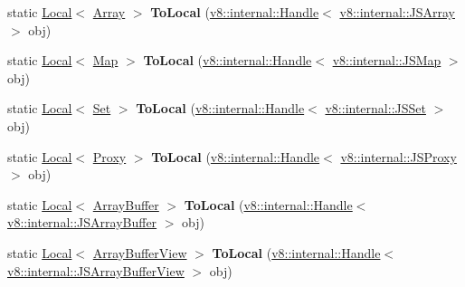\begin{DoxyCompactItemize}
\item 
static \hyperlink{classv8_1_1_local}{Local}$<$ \hyperlink{classv8_1_1_array}{Array} $>$ {\bfseries To\+Local} (\hyperlink{classv8_1_1internal_1_1_handle}{v8\+::internal\+::\+Handle}$<$ \hyperlink{classv8_1_1internal_1_1_j_s_array}{v8\+::internal\+::\+J\+S\+Array} $>$ obj)\hypertarget{classv8_1_1_utils_a574263d874f1c510592f745e3e26089b}{}\label{classv8_1_1_utils_a574263d874f1c510592f745e3e26089b}

\item 
static \hyperlink{classv8_1_1_local}{Local}$<$ \hyperlink{classv8_1_1_map}{Map} $>$ {\bfseries To\+Local} (\hyperlink{classv8_1_1internal_1_1_handle}{v8\+::internal\+::\+Handle}$<$ \hyperlink{classv8_1_1internal_1_1_j_s_map}{v8\+::internal\+::\+J\+S\+Map} $>$ obj)\hypertarget{classv8_1_1_utils_a5c596d6b1b5fec92ae8bcdec13edc4fc}{}\label{classv8_1_1_utils_a5c596d6b1b5fec92ae8bcdec13edc4fc}

\item 
static \hyperlink{classv8_1_1_local}{Local}$<$ \hyperlink{classv8_1_1_set}{Set} $>$ {\bfseries To\+Local} (\hyperlink{classv8_1_1internal_1_1_handle}{v8\+::internal\+::\+Handle}$<$ \hyperlink{classv8_1_1internal_1_1_j_s_set}{v8\+::internal\+::\+J\+S\+Set} $>$ obj)\hypertarget{classv8_1_1_utils_ac3774c0f66b1b6a3d8de716ef7aebe9e}{}\label{classv8_1_1_utils_ac3774c0f66b1b6a3d8de716ef7aebe9e}

\item 
static \hyperlink{classv8_1_1_local}{Local}$<$ \hyperlink{classv8_1_1_proxy}{Proxy} $>$ {\bfseries To\+Local} (\hyperlink{classv8_1_1internal_1_1_handle}{v8\+::internal\+::\+Handle}$<$ \hyperlink{classv8_1_1internal_1_1_j_s_proxy}{v8\+::internal\+::\+J\+S\+Proxy} $>$ obj)\hypertarget{classv8_1_1_utils_a2394394d4f782cf2e1dffd302689b81f}{}\label{classv8_1_1_utils_a2394394d4f782cf2e1dffd302689b81f}

\item 
static \hyperlink{classv8_1_1_local}{Local}$<$ \hyperlink{classv8_1_1_array_buffer}{Array\+Buffer} $>$ {\bfseries To\+Local} (\hyperlink{classv8_1_1internal_1_1_handle}{v8\+::internal\+::\+Handle}$<$ \hyperlink{classv8_1_1internal_1_1_j_s_array_buffer}{v8\+::internal\+::\+J\+S\+Array\+Buffer} $>$ obj)\hypertarget{classv8_1_1_utils_ac51eb1eb431ba42ecf23ca81e6e2f4f1}{}\label{classv8_1_1_utils_ac51eb1eb431ba42ecf23ca81e6e2f4f1}

\item 
static \hyperlink{classv8_1_1_local}{Local}$<$ \hyperlink{classv8_1_1_array_buffer_view}{Array\+Buffer\+View} $>$ {\bfseries To\+Local} (\hyperlink{classv8_1_1internal_1_1_handle}{v8\+::internal\+::\+Handle}$<$ \hyperlink{classv8_1_1internal_1_1_j_s_array_buffer_view}{v8\+::internal\+::\+J\+S\+Array\+Buffer\+View} $>$ obj)\hypertarget{classv8_1_1_utils_ad4a90baf574da81c4906d7ea564e1d60}{}\label{classv8_1_1_utils_ad4a90baf574da81c4906d7ea564e1d60}


\end{DoxyCompactItemize}

